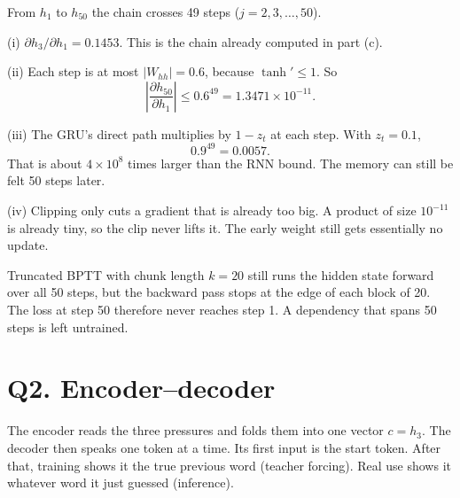 \documentclass[11pt,a4paper]{article}
\begin{document}
From \(h_1\) to \(h_{50}\) the chain crosses 49 steps (\(j=2,3,\ldots,50\)).

\begin{answer}[Q1(e)]
(i) \(\partial h_3/\partial h_1 = 0.1453\). This is the chain already computed in part (c).

(ii) Each step is at most \(|W_{hh}|=0.6\), because \(\tanh'\le 1\). So
\[
\left|\frac{\partial h_{50}}{\partial h_1}\right| \le 0.6^{49} = 1.3471\times 10^{-11}.
\]

(iii) The GRU's direct path multiplies by \(1-z_t\) at each step. With \(z_t=0.1\),
\[
0.9^{49}=0.0057.
\]
That is about \(4\times 10^{8}\) times larger than the RNN bound. The memory can still be felt 50 steps later.

(iv) Clipping only cuts a gradient that is already too big. A product of size \(10^{-11}\) is already tiny, so the clip never lifts it. The early weight still gets essentially no update.

Truncated BPTT with chunk length \(k=20\) still runs the hidden state forward over all 50 steps, but the backward pass stops at the edge of each block of 20. The loss at step 50 therefore never reaches step 1. A dependency that spans 50 steps is left untrained.
\end{answer}

\section{Q2. Encoder--decoder}

\begin{idea}
The encoder reads the three pressures and folds them into one vector \(c=h_3\). The decoder then speaks one token at a time. Its first input is the start token. After that, training shows it the true previous word (teacher forcing). Real use shows it whatever word it just guessed (inference).
\end{idea}
\end{document}
